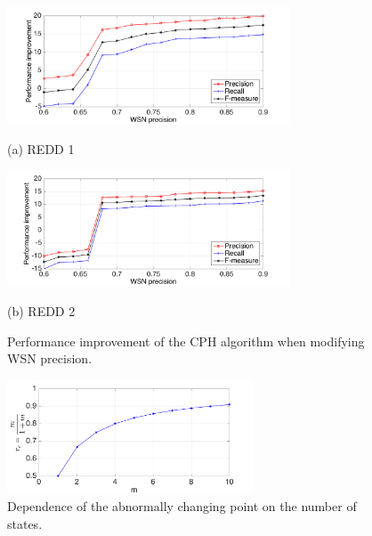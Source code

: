 \begin{figure}[htb]
\begin{minipage}[b]{1\linewidth}
  \centering
  \centerline{\includegraphics[width=0.75\textwidth]{./chapters/chapter5/images/R1_cph_pr.pdf}}
  \centerline{(a) REDD 1}\medskip
\end{minipage}
\hfill
\begin{minipage}[b]{1\linewidth}
  \centering
  \centerline{\includegraphics[width=0.75\textwidth]{./chapters/chapter5/images/R2_cph_pr.pdf}}
  \centerline{(b) REDD 2}\medskip
\end{minipage}
\caption{Performance improvement of the CPH algorithm when modifying WSN precision.}
\label{fig:SR3}
%
\end{figure}


\begin{figure}[h]
\centering
\includegraphics[width=0.65\textwidth]{./chapters/chapter5/images/breakPR.pdf} 
\caption{Dependence of the abnormally changing point on the number of states.} 
\label{fig:SR4} 
\end{figure}







